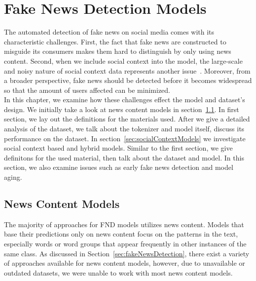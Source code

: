 
\chapter{Fake News Detection Models}\label{chapter:fnd_models}
The automated detection of fake news on social media comes with its characteristic challenges. First, the fact
that fake news are constructed to misguide its consumers makes them hard to distinguish by only using news content. Second, when we include social context into the model, the large-scale and noisy nature of social context data represents another issue~\parencite{HierarchicalPropagationNetworksForFND_Shu}. Moreover, from a broader perspective, fake news should be detected before it becomes widespread so that the amount of users affected can be minimized.\\
In this chapter, we examine how these challenges effect the model and dataset's design. We initially take a look at news content models in section~\ref{sec:newsContentModels}. In first section, we lay out the definitions for the materials used. After we give a detailed analysis of the dataset, we talk about the tokenizer and model itself, discuss its performance on the dataset. In section~\ref{sec:socialContextModels} we investigate social context based and hybrid models. Similar to the first section, we give definitons for the used material, then talk about the dataset and model. In this section, we also examine issues such as early fake news detection and model aging.\\

\section{News Content Models}
\label{sec:newsContentModels}
The majority of approaches for FND models utilizes news content. Models that base their predictions only on news content focus on the patterns in the text, especially words or word groups that appear frequently in other instances of the same class. As discussed in Section~\ref{sec:fakeNewsDetection}, there exist a variety of approaches available for news content models, however, due to unavailable or outdated datasets, we were unable to work with most news content models.

